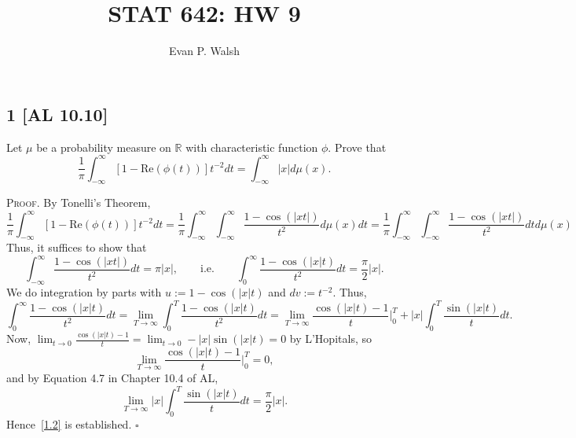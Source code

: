 \documentclass[12pt]{article}
\title{STAT 642: HW 9}
\author{Evan P. Walsh}
\newcounter{ProofCounter}
\newenvironment{Proof}{\stepcounter{ProofCounter}\textsc{Proof.}}{\hfill$\square$}
\begin{document}
\maketitle


\subsection*{1 [AL 10.10]}
\begin{tcolorbox}
  Let $\mu$ be a probability measure on $\mathbb{R}$ with characteristic function $\phi$. Prove that 
  \[ \frac{1}{\pi} \int_{-\infty}^{\infty}[1 - \text{Re}(\phi(t))]t^{-2}dt = \int_{-\infty}^{\infty}|x|d\mu(x). \]
\end{tcolorbox}
\begin{Proof}
  By Tonelli's Theorem,
  \[
    \frac{1}{\pi}\int_{-\infty}^{\infty}[1 - \text{Re}(\phi(t))]t^{-2}dt = \frac{1}{\pi}\int_{-\infty}^{\infty}\int_{-\infty}^{\infty}\frac{1 -
    \cos(|xt|)}{t^{2}}d\mu(x) dt = \frac{1}{\pi}\int_{-\infty}^{\infty}\int_{-\infty}^{\infty}\frac{1 - \cos(|xt|)}{t^{2}}dt d\mu(x)
  \]
  Thus, it suffices to show that 
  \begin{equation}
    \int_{-\infty}^{\infty}\frac{1 - \cos(|xt|)}{t^{2}}dt = \pi|x|, \qquad \text{i.e.} \qquad \int_{0}^{\infty}\frac{1 - \cos(|x|t)}{t^{2}}dt =
    \frac{\pi}{2}|x|.
    \label{1.2}
  \end{equation}
  We do integration by parts with $u := 1 - \cos(|x|t)$ and $dv := t^{-2}$. Thus,
  \[ \int_{0}^{\infty}\frac{1 - \cos(|x|t)}{t^{2}}dt = \lim_{T\rightarrow\infty}\int_{0}^{T}\frac{1 - \cos(|x|t)}{t^{2}}dt =
  \lim_{T\rightarrow\infty}\frac{\cos(|x|t) - 1}{t}\bigg|_{0}^{T} + |x|\int_{0}^{T}\frac{\sin(|x|t)}{t}dt. \]
  Now, $\lim_{t \rightarrow 0}\frac{\cos(|x|t) - 1}{t} = \lim_{t\rightarrow 0}-|x|\sin(|x|t) = 0$ by L'Hopitals, so 
  \[
    \lim_{T\rightarrow\infty}\frac{\cos(|x|t) - 1}{t}\bigg|_{0}^{T} = 0,
  \]
  and by Equation 4.7 in Chapter 10.4 of AL,
  \[ \lim_{T\rightarrow\infty}|x|\int_{0}^{T}\frac{\sin(|x|t)}{t}dt = \frac{\pi}{2}|x|. \]
  Hence~\eqref{1.2} is established.
\end{Proof}


\newpage
\end{document}
